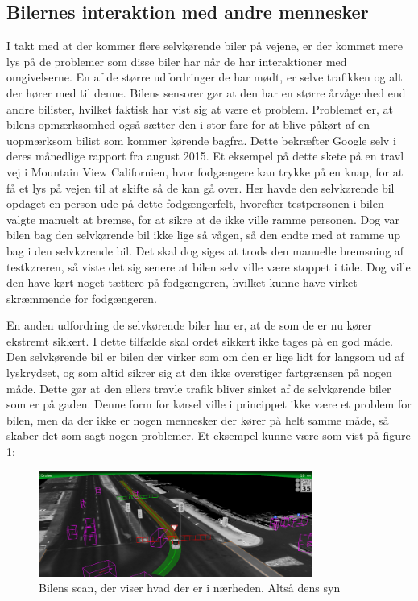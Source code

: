 \subsection{Bilernes interaktion med andre mennesker}
I takt med at der kommer flere  selvkørende biler på vejene, er der kommet mere lys på de problemer som disse biler har når de har interaktioner med omgivelserne. En af de større udfordringer de har mødt, er selve trafikken og alt der hører med til denne. Bilens sensorer gør at den har en større årvågenhed end andre bilister, hvilket faktisk har vist sig at være et problem. Problemet er, at bilens opmærksomhed også sætter den i stor fare for at blive påkørt af en uopmærksom bilist som kommer kørende bagfra. Dette bekræfter Google selv i deres månedlige rapport fra august 2015\cite{GOOG_MONTHLY}. Et eksempel på dette skete på en travl vej i Mountain View Californien, hvor fodgængere kan trykke på en knap, for at få et lys på vejen til at skifte så de kan gå over. Her havde den selvkørende bil opdaget en person ude på dette fodgængerfelt, hvorefter testpersonen i bilen valgte  manuelt at bremse, for at sikre at de ikke ville ramme personen. Dog var bilen bag den selvkørende bil ikke lige så vågen, så den endte med at ramme up bag i den selvkørende bil. Det skal dog siges at trods den manuelle bremsning af testkøreren, så viste det sig senere at bilen selv ville være stoppet i tide. Dog ville den have kørt noget tættere på fodgængeren, hvilket kunne have virket skræmmende for fodgængeren\cite{GOOG_MONTHLY}. 

En anden udfordring de selvkørende biler har er, at de som de er nu kører ekstremt sikkert. I dette tilfælde skal ordet sikkert ikke tages på en god måde. Den selvkørende bil er bilen der virker som om den er lige lidt for langsom ud af lyskrydset, og som altid sikrer sig at den ikke overstiger fartgrænsen på nogen måde. Dette gør at den ellers travle trafik bliver sinket af de selvkørende biler som er på gaden. Denne form for kørsel ville i princippet ikke være et problem for bilen, men da der ikke er nogen mennesker der kører på helt samme måde, så skaber det som sagt nogen problemer. Et eksempel kunne være som vist på figure 1:

\begin{figure}[h!]
    \centering
    \includegraphics[width=0.8\textwidth]{images/google_vision.png}
    \caption{Bilens scan, der viser hvad der er i nærheden. Altså dens syn}
    \label{fig:car_vision}
\end{figure}

